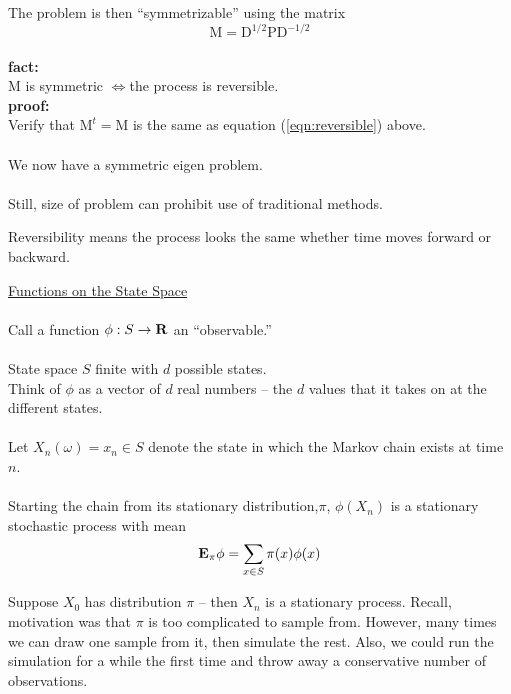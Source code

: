 \documentclass{slides}
\newcommand{\Epi}{\mbox{{\bf E}}\ensuremath{_{\pi}}}
\newcommand{\M}{\mbox{M}}
\newcommand{\D}{\mbox{D}}
\newcommand{\Prob}{\mbox{P}}
\begin{document}
\begin{slide}
The problem is then ``symmetrizable'' using the matrix
\[\M = \D^{1/2}\Prob \D^{-1/2}\]
\\
{\bf fact:}\\ M is symmetric $\Leftrightarrow$the process is reversible.\\
{\small{\bf proof:} \\
Verify that $\M^t = \M$ is the same as equation (\ref{eqn:reversible}) above.}
\\\\
We now have a symmetric eigen problem.  \\\\
Still, size of problem can prohibit use of traditional methods.  
\end{slide}

\begin{note} Reversibility means 
the process looks the same whether time 
moves forward or backward.
\end{note}

\begin{slide}
\underline{Functions on the State Space}
\\\\
Call a function $\phi :S \rightarrow {\bf R}$
an ``observable.''
\\\\
State space $S$ finite with $d$ possible states.  \\
Think of $\phi$ as a vector of $d$ real numbers -- 
the $d$ values that it takes on at the different states.
\\\\
Let $X_n(\omega)=x_n \in S$ denote the state in which the 
Markov chain exists at time $n$. 
\\\\
Starting the chain from its stationary distribution,$\pi$,
$\phi(X_n)$ is a stationary stochastic process with mean 
\[ \Epi\phi = \sum_{x \in S}\pi(x)\phi(x) \]
\end{slide}

\begin{note}
Suppose $X_0$ has distribution $\pi$ -- then $X_n$ is 
a stationary process.  Recall, motivation was that $\pi$ 
is too complicated to sample from.  However, many times
we can draw one sample from it, then simulate the rest.
Also, we could run the simulation for a while the first time
and throw away a conservative number of observations.
\end{note}
\end{document}

